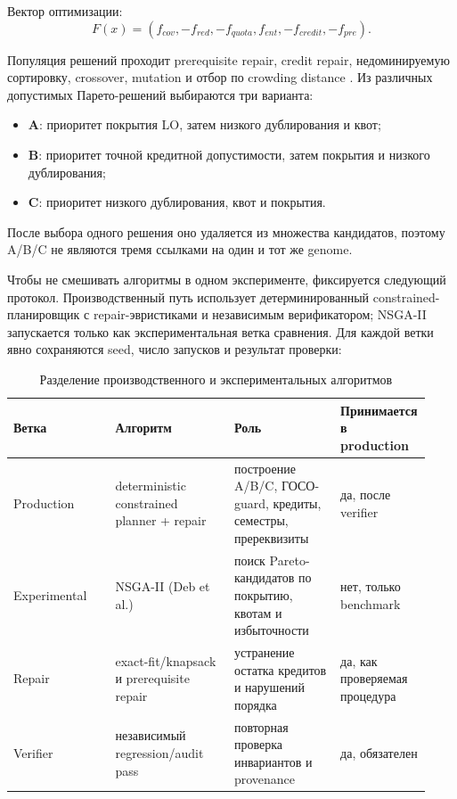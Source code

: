 \documentclass[twoside,11pt]{article}
\begin{document}
Вектор оптимизации:
\begin{equation}
  F(x)=
  \left(
  f_{cov},
  -f_{red},
  -f_{quota},
  f_{ent},
  -f_{credit},
  -f_{pre}
  \right).
  \label{eq:objective-vector}
\end{equation}

Популяция решений проходит prerequisite repair, credit repair, недоминируемую сортировку, crossover, mutation и отбор по crowding distance \cite{Deb2002}. Из различных допустимых Парето-решений выбираются три варианта:
\begin{itemize}
  \item \textbf{A}: приоритет покрытия LO, затем низкого дублирования и квот;
  \item \textbf{B}: приоритет точной кредитной допустимости, затем покрытия и низкого дублирования;
  \item \textbf{C}: приоритет низкого дублирования, квот и покрытия.
\end{itemize}
После выбора одного решения оно удаляется из множества кандидатов, поэтому A/B/C не являются тремя ссылками на один и тот же genome.

Чтобы не смешивать алгоритмы в одном эксперименте, фиксируется следующий протокол.
Производственный путь использует детерминированный constrained-планировщик с
repair-эвристиками и независимым верификатором; NSGA-II запускается только как
экспериментальная ветка сравнения. Для каждой ветки явно сохраняются seed, число
запусков и результат проверки:

\begin{table}[H]
\centering
\caption{Разделение производственного и экспериментальных алгоритмов}
\label{tab:planner-protocol-roles}
\begin{tabular}{p{0.24\linewidth}p{0.29\linewidth}p{0.25\linewidth}p{0.15\linewidth}}
\toprule
\textbf{Ветка} & \textbf{Алгоритм} & \textbf{Роль} & \textbf{Принимается в production}\\
\midrule
Production & deterministic constrained planner + repair & построение A/B/C, ГОСО-guard, кредиты, семестры, пререквизиты & да, после verifier\\
Experimental & NSGA-II (Deb et al.) & поиск Pareto-кандидатов по покрытию, квотам и избыточности & нет, только benchmark\\
Repair & exact-fit/knapsack и prerequisite repair & устранение остатка кредитов и нарушений порядка & да, как проверяемая процедура\\
Verifier & независимый regression/audit pass & повторная проверка инвариантов и provenance & да, обязателен\\
\bottomrule
\end{tabular}
\end{table}
\end{document}
